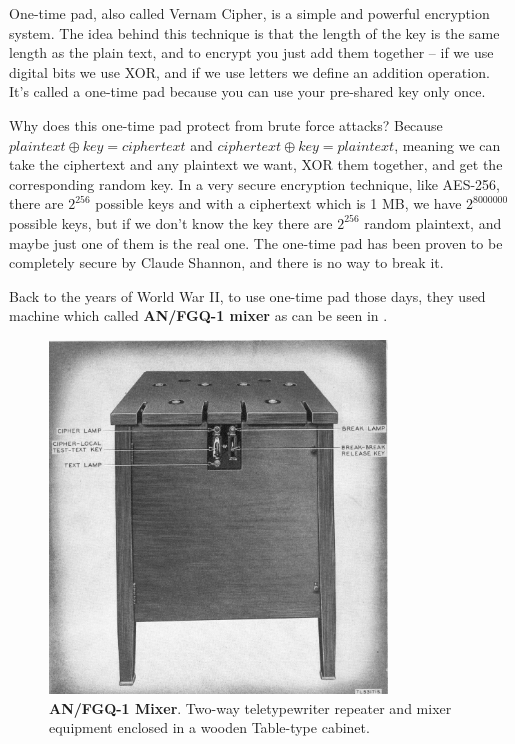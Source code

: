 One-time pad, also called Vernam Cipher, is a simple and powerful encryption system. The idea behind this technique is that the length of the key is the same length as the plain text, and to encrypt you just add them together – if we use digital bits we use XOR, and if we use letters we define an addition operation. It's called a one-time pad because you can use your pre-shared key only once.

Why does this one-time pad protect from brute force attacks? Because $plaintext \oplus key = ciphertext$ and $ciphertext \oplus key = plaintext$, meaning we can take the ciphertext and any plaintext we want, XOR them together, and get the corresponding random key. In a very secure encryption technique, like AES-256, there are \(2^{256}\) possible keys and with a ciphertext which is 1 MB, we have \(2^{8000000}\) possible keys, but if we don't know the key there are \(2^{256}\) random plaintext, and maybe just one of them is the real one. The one-time pad has been proven to be completely secure by Claude Shannon, and there is no way to break it.

Back to the years of World War II, to use one-time pad those days, they used machine which called \textbf{AN/FGQ-1 mixer}\cite{cryptoMix} as can be seen in .

\begin{figure}[!ht]
    \centering
    \includegraphics[width=0.8\textwidth]{images/ch1_Intro/MIxer.jpg}
    \caption{\textbf{AN/FGQ-1 Mixer}. Two-way teletypewriter repeater and mixer equipment enclosed in a wooden Table-type cabinet.}
    \label{fig:Mixer}
\end{figure}

